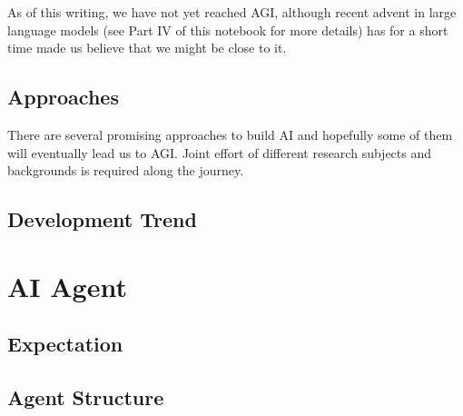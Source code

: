 As of this writing, we have not yet reached AGI, although recent advent in large language models (see Part IV of this notebook for more details) has for a short time made us believe that we might be close to it.

\subsection{Approaches}

There are several promising approaches to build AI and hopefully some of them will eventually lead us to AGI. Joint effort of different research subjects and backgrounds is required along the journey.


\subsection{Development Trend}

\section{AI Agent}

\subsection{Expectation}

\subsection{Agent Structure}
